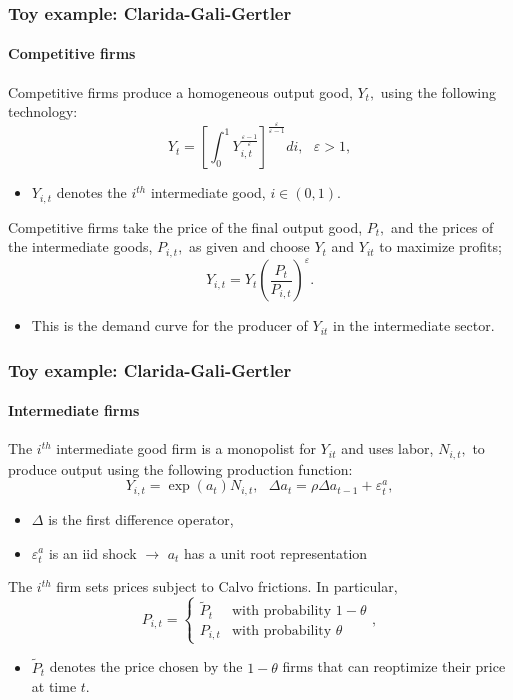 \documentclass[handout]{beamer}  %
\begin{document}
\begin{frame}    \frametitle{Toy example: Clarida-Gali-Gertler}\framesubtitle{Competitive firms}
Competitive firms produce a homogeneous output good, $Y_{t},$ using the following technology:
\[
Y_{t}=\left[ \int_{0}^{1}Y_{i,t}^{\frac{\varepsilon -1}{\varepsilon }}\right]
^{\frac{\varepsilon }{\varepsilon -1}}di,\text{ }\varepsilon >1,
\]%
\begin{itemize}
\item $Y_{i,t}$ denotes the $i^{th}$ intermediate good, $i\in \left(0,1\right).$
\end{itemize}
Competitive firms take the price of the final output good, $P_{t},$ and the prices of the intermediate goods, $P_{i,t},$ as given and choose $Y_{t}$ and $Y_{it}$ to maximize profits;
\[
Y_{i,t}=Y_{t}\left( \frac{P_{t}}{P_{i,t}}\right) ^{\varepsilon }.
\]%
\begin{itemize}
  \item This is the demand curve for the producer of $Y_{it}$ in the intermediate sector.
\end{itemize}
\end{frame}

\begin{frame}    \frametitle{Toy example: Clarida-Gali-Gertler}\framesubtitle{Intermediate firms}
The $i^{th}$ intermediate good firm is a monopolist for $Y_{it}$ and uses labor, $N_{i,t},$
to produce output using the following production function:%
\[
Y_{i,t}=\exp \left( a_{t}\right) N_{i,t},\text{ }\Delta a_{t}=\rho \Delta
a_{t-1}+\varepsilon _{t}^{a},
\]%
\begin{itemize}
  \item $\Delta $ is the first difference operator,
  \item $\varepsilon _{t}^{a}$ is an iid shock $\rightarrow$ $a_{t}$ has a unit root representation
\end{itemize}
The $i^{th}$ firm sets prices subject to Calvo frictions. In particular,%
\[
P_{i,t}=\left\{
\begin{array}{cc}
\tilde{P}_{t} & \text{with probability }1-\theta \\
P_{i,t} & \text{with probability }\theta%
\end{array}%
\right. ,
\]%
\begin{itemize}
  \item $\tilde{P}_{t}$ denotes the price chosen by the $1-\theta $ firms that can reoptimize their price at time $t.$
\end{itemize}
\end{frame}
\end{document}
